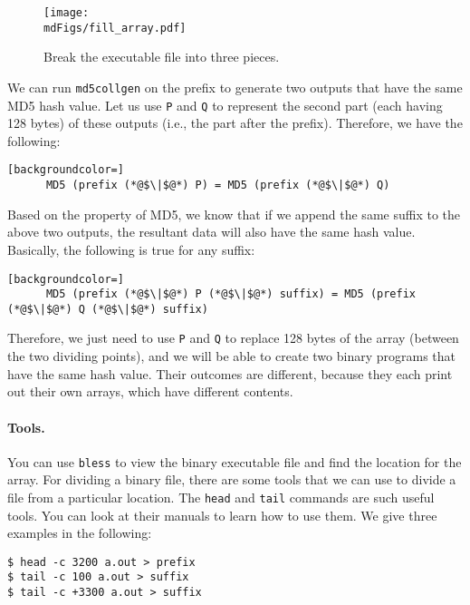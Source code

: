 \begin{figure}[htb]
\begin{center}
\texttt{[image: \\mdFigs/fill\_array.pdf]}
\end{center}
\caption{Break the executable file into three pieces.}
\label{md5:fig:fill_array}
\end{figure}
 
We can run \texttt{md5collgen} on the prefix to generate 
two outputs that have the same MD5 hash value.
Let us use \texttt{P} and \texttt{Q} to represent the 
second part (each having 128 bytes) of these outputs (i.e., the part after the prefix). 
Therefore, we have the following:

\begin{lstlisting}[backgroundcolor=]
      MD5 (prefix (*@$\|$@*) P) = MD5 (prefix (*@$\|$@*) Q)
\end{lstlisting}

Based on the property of MD5, we know that if we append the same suffix to 
the above two outputs, the resultant data will also have the 
same hash value. Basically, the following is true for any suffix:

\begin{lstlisting}[backgroundcolor=]
      MD5 (prefix (*@$\|$@*) P (*@$\|$@*) suffix) = MD5 (prefix (*@$\|$@*) Q (*@$\|$@*) suffix)
\end{lstlisting}

Therefore, we just need to use \texttt{P} and \texttt{Q} to replace 
128 bytes of the array (between the two dividing points), and we will be able to
create two binary programs that have the same hash value. 
Their outcomes are different, because they each print out their own arrays, which have
different contents. 


\paragraph{Tools.} You can use \texttt{bless}
to view the binary executable file and find the location for the 
array. For dividing a binary file, there are some 
tools that we can use to 
divide a file from a particular location. The \texttt{head} 
and \texttt{tail} commands are such useful tools. 
You can look at their manuals to
learn how to use them. We give three examples in the following:  

\begin{lstlisting}
$ head -c 3200 a.out > prefix
$ tail -c 100 a.out > suffix
$ tail -c +3300 a.out > suffix
\end{lstlisting}

